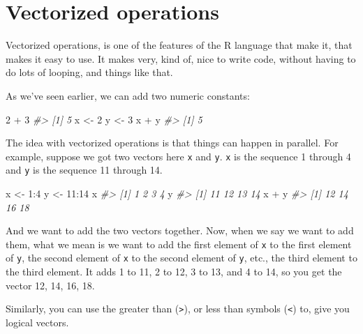 \documentclass[
]{book}
\newenvironment{Shaded}{\begin{snugshade}}{\end{snugshade}}
\newcommand{\CommentTok}[1]{\textcolor[rgb]{0.56,0.35,0.01}{\textit{#1}}}
\newcommand{\DecValTok}[1]{\textcolor[rgb]{0.00,0.00,0.81}{#1}}
\newcommand{\NormalTok}[1]{#1}
\newcommand{\OtherTok}[1]{\textcolor[rgb]{0.56,0.35,0.01}{#1}}
\newcommand{\SpecialCharTok}[1]{\textcolor[rgb]{0.00,0.00,0.00}{#1}}
\begin{document}
\hypertarget{vectorized-operations}{%
\section{Vectorized operations}\label{vectorized-operations}}

Vectorized operations, is one of the features of the R language that make it, that makes it easy to use. It makes very, kind of, nice to write code, without having to do lots of looping, and things like that.

As we've seen earlier, we can add two numeric constants:

\begin{Shaded}
\begin{Highlighting}[]
\DecValTok{2} \SpecialCharTok{+} \DecValTok{3}
\CommentTok{\#\textgreater{} [1] 5}
\NormalTok{x }\OtherTok{\textless{}{-}} \DecValTok{2}
\NormalTok{y }\OtherTok{\textless{}{-}} \DecValTok{3}
\NormalTok{x }\SpecialCharTok{+}\NormalTok{ y}
\CommentTok{\#\textgreater{} [1] 5}
\end{Highlighting}
\end{Shaded}

The idea with vectorized operations is that things can happen in parallel. For example, suppose we got two vectors
here \texttt{x} and \texttt{y}. \texttt{x} is the sequence 1 through 4 and \texttt{y} is the sequence 11 through 14.

\begin{Shaded}
\begin{Highlighting}[]
\NormalTok{x }\OtherTok{\textless{}{-}} \DecValTok{1}\SpecialCharTok{:}\DecValTok{4}
\NormalTok{y }\OtherTok{\textless{}{-}} \DecValTok{11}\SpecialCharTok{:}\DecValTok{14}
\NormalTok{x}
\CommentTok{\#\textgreater{} [1] 1 2 3 4}
\NormalTok{y}
\CommentTok{\#\textgreater{} [1] 11 12 13 14}
\NormalTok{x }\SpecialCharTok{+}\NormalTok{ y}
\CommentTok{\#\textgreater{} [1] 12 14 16 18}
\end{Highlighting}
\end{Shaded}

And we want to add the two vectors together. Now, when we say we want to add them, what we mean is we want to add the first element of \texttt{x} to the first element of \texttt{y}, the second element of \texttt{x} to the second element of \texttt{y}, etc., the third element
to the third element. It adds 1 to 11, 2 to 12, 3 to 13, and 4 to 14, so you get the vector 12, 14, 16, 18.

Similarly, you can use the greater than (\texttt{\textgreater{}}), or less than symbols (\texttt{\textless{}}) to, give you logical vectors.
\end{document}
